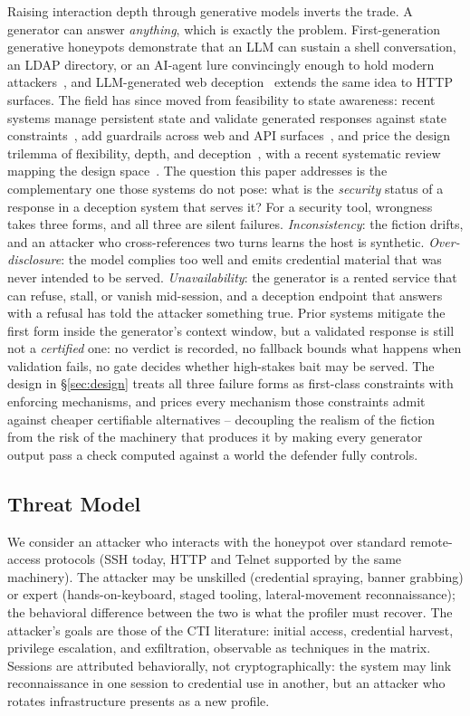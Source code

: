 Raising interaction depth through generative models inverts the trade.
A generator can answer \emph{anything}, which is exactly the problem.
First-generation generative honeypots demonstrate that an LLM can sustain
a shell conversation, an LDAP directory, or an AI-agent lure convincingly
enough to hold modern attackers~\cite{valeros2024,reworr2024,jimenez2025},
and LLM-generated web deception~\cite{galah2024} extends the same idea to
HTTP surfaces. The field has since moved from feasibility to state
awareness: recent systems manage persistent state and validate generated
responses against state constraints~\cite{li2026llmsshh}, add guardrails
across web and API surfaces~\cite{laragutierrez2026genpot},
and price the design trilemma of flexibility, depth, and
deception~\cite{wang2026honeygpt}, with a recent systematic review
mapping the design space~\cite{bridges2026}. The question this paper
addresses is the complementary one those systems do not pose: what is
the \emph{security} status of a response in a deception system that
serves it? For a security tool, wrongness takes three forms, and all
three are silent failures. \emph{Inconsistency}: the fiction drifts, and
an attacker who cross-references two turns learns the host is synthetic.
\emph{Over-disclosure}: the model complies too well and emits credential
material that was never intended to be served. \emph{Unavailability}:
the generator is a rented service that can refuse, stall, or vanish
mid-session, and a deception endpoint that answers with a refusal has
told the attacker something true. Prior systems mitigate the first form
inside the generator's context window, but a validated response is
still not a \emph{certified} one: no verdict is recorded, no fallback
bounds what happens when validation fails, no gate decides whether
high-stakes bait may be served. The design in \S\ref{sec:design} treats
all three failure forms as first-class constraints with enforcing
mechanisms, and prices every mechanism those constraints admit against
cheaper certifiable alternatives -- decoupling the realism of the
fiction from the risk of the machinery that produces it by making every
generator output pass a check computed against a world the defender
fully controls.

\subsection{Threat Model}
\label{sec:threatmodel}
We consider an attacker who interacts with the honeypot over standard
remote-access protocols (SSH today, HTTP and Telnet supported by the same
machinery). The attacker may be unskilled (credential spraying, banner
grabbing) or expert (hands-on-keyboard, staged tooling, lateral-movement
reconnaissance); the behavioral difference between the two is what the
profiler must recover. The attacker's goals are those of the CTI
literature: initial access, credential harvest, privilege escalation, and
exfiltration, observable as techniques in the \attck matrix. Sessions are
attributed behaviorally, not cryptographically: the system may link
reconnaissance in one session to credential use in another, but an
attacker who rotates infrastructure presents as a new profile.

